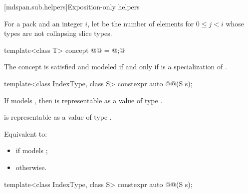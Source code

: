 [mdspan.sub.helpers]{Exposition-only helpers}

\pnum
{}%
For a pack  and an integer $i$,
let  be the number of elements 
for $0 \le j < i$ whose types are not collapsing slice types.

\begin{itemdecl}
template<class T>
  concept @@ = @\seebelow;@
\end{itemdecl}

\begin{itemdescr}
\pnum
The concept 
is satisfied and modeled if and only
if  is a specialization of .
\end{itemdescr}

%
\begin{itemdecl}
template<class IndexType, class S>
  constexpr auto @@(S s);
\end{itemdecl}

\begin{itemdescr}
\pnum
\mandates
If  models ,
then 
is representable as a value of type .

\pnum
\expects
{}
is representable as a value of type .

\pnum
\effects
Equivalent to:
\begin{itemize}
\item
{}
if  models ;
\item
{} otherwise.
\end{itemize}
\end{itemdescr}

\begin{itemdecl}
template<class IndexType, class S>
  constexpr auto @@(S s);
\end{itemdecl}

